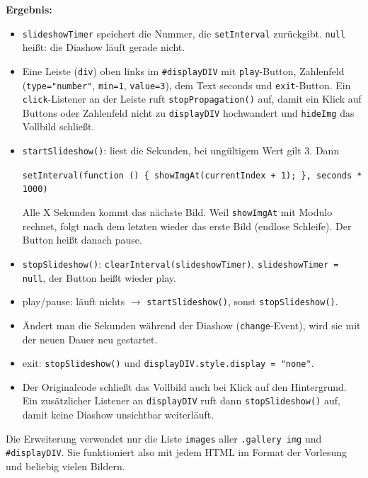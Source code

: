 \documentclass[11pt,a4paper]{article}
\begin{document}
\medskip
\textbf{Ergebnis:}
\begin{itemize}
  \item \texttt{slideshowTimer} speichert die Nummer, die
    \texttt{setInterval} zurückgibt. \texttt{null} heißt: die Diashow
    läuft gerade nicht.
  \item Eine Leiste (\texttt{div}) oben links im \texttt{\#displayDIV} mit
    \texttt{play}-Button, Zahlenfeld (\texttt{type="number"},
    \texttt{min=1}, \texttt{value=3}), dem Text \glqq seconds\grqq{} und
    \texttt{exit}-Button. Ein \texttt{click}-Listener an der Leiste ruft
    \texttt{stopPropagation()} auf, damit ein Klick auf Buttons oder
    Zahlenfeld nicht zu \texttt{displayDIV} hochwandert und
    \texttt{hideImg} das Vollbild schließt.
  \item \texttt{startSlideshow()}: liest die Sekunden, bei ungültigem Wert
    gilt 3. Dann
    \begin{center}
    \texttt{setInterval(function () \{ showImgAt(currentIndex + 1); \}, seconds * 1000)}
    \end{center}
    Alle X Sekunden kommt das nächste Bild. Weil \texttt{showImgAt} mit
    Modulo rechnet, folgt nach dem letzten wieder das erste Bild (endlose
    Schleife). Der Button heißt danach \glqq pause\grqq.
  \item \texttt{stopSlideshow()}: \texttt{clearInterval(slideshowTimer)},
    \texttt{slideshowTimer = null}, der Button heißt wieder \glqq play\grqq.
  \item play/pause: läuft nichts $\rightarrow$ \texttt{startSlideshow()},
    sonst \texttt{stopSlideshow()}.
  \item Ändert man die Sekunden während der Diashow
    (\texttt{change}-Event), wird sie mit der neuen Dauer neu gestartet.
  \item exit: \texttt{stopSlideshow()} und
    \texttt{displayDIV.style.display = "none"}.
  \item Der Originalcode schließt das Vollbild auch bei Klick auf den
    Hintergrund. Ein zusätzlicher Listener an \texttt{displayDIV} ruft dann
    \texttt{stopSlideshow()} auf, damit keine Diashow unsichtbar
    weiterläuft.
\end{itemize}
Die Erweiterung verwendet nur die Liste \texttt{images} aller
\texttt{.gallery img} und \texttt{\#displayDIV}. Sie funktioniert also mit
jedem HTML im Format der Vorlesung und beliebig vielen Bildern.
\end{document}
